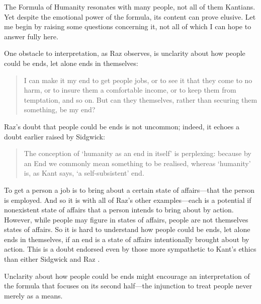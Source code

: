 \documentclass[12pt]{article}
\begin{document}
The Formula of Humanity resonates with many people, not all of them Kantians. Yet despite the emotional power of the formula, its content can prove elusive. Let me begin by raising some questions concerning it, not all of which I can hope to answer fully here.

One obstacle to interpretation, as Raz observes, is unclarity about how people could be ends, let alone ends in themselves: 
\begin{quote}
	I can make it my end to get people jobs, or to see it that they come to no harm, or to insure them a comfortable income, or to keep them from temptation, and so on. But can they themselves, rather than securing them something, be my end? \citep[144]{Raz:2001ps} 
\end{quote}
Raz's doubt that people could be ends is not uncommon; indeed, it echoes a doubt earlier raised by Sidgwick:
\begin{quote}
    The conception of `humanity as an end in itself' is perplexing: because by an End we commonly mean something to be realised, whereas `humanity' is, as Kant says, `a self-subsistent' end. \citep[39]{Sidgwick:1981jk}
\end{quote}
To get a person a job is to bring about a certain state of affairs---that the person is employed. And so it is with all of Raz's other examples---each is a potential if nonexistent state of affairs that a person intends to bring about by action. However, while people may figure in states of affairs, people are not themselves states of affairs. So it is hard to understand how people could be ends, let alone ends in themselves, if an end is a state of affairs intentionally brought about by action. This is a doubt endorsed even by those more sympathetic to Kant's ethics than either Sidgwick and Raz \citep[see, for example,][]{Lo:1987xy,Ross:1954jk,Wolff:1973qv}.

Unclarity about how people could be ends might encourage an interpretation of the formula that focuses on its second half---the injunction to treat people never merely as a means.
\end{document}
